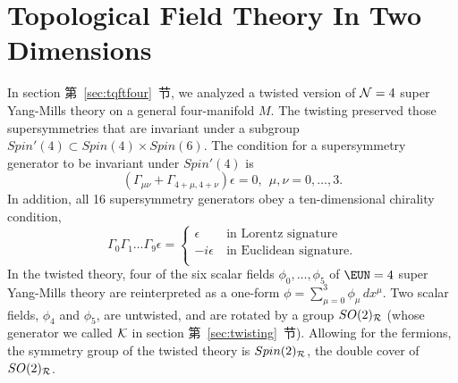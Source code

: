 
\section{Topological Field Theory In Two Dimensions}
\label{sec:tqfttwo}

In section 第~\ref{sec:tqftfour}~节, we analyzed a twisted version of ${\cal
N}=4$ super Yang-Mills theory on a general four-manifold $M$.  The
twisting preserved those supersymmetries that are invariant under
a subgroup $Spin'(4)\subset Spin(4)\times Spin(6)$.  The condition
for a supersymmetry generator to be invariant under $Spin'(4)$ is
\setcounter{equation}{0}
\begin{equation}\label{eq:tory}
\left(\Gamma_{\mu\nu}+\Gamma_{4+\mu,4+\nu}\right)\epsilon=0,
~~\mu,\nu=0,\dots,3.
\end{equation}
  In addition, all 16 supersymmetry
generators obey a ten-dimensional chirality condition,
\setcounter{equation}{1}
\begin{equation}\label{eq:nory}
\Gamma_0\Gamma_1\dots\Gamma_9\epsilon=\begin{cases}\epsilon&
~\text{in Lorentz signature}\\-i\epsilon&~\text{in Euclidean
signature.}\\\end{cases}
\end{equation}
 In the twisted theory, four of the six scalar
fields $\phi_0,\dots,\phi_5$ of ${\EUN}=4$ super Yang-Mills theory
are reinterpreted as a one-form
$\phi=\sum_{\mu=0}^3\phi_\mu\,dx^\mu$. Two scalar fields, $\phi_4$
and $\phi_5$, are untwisted, and are rotated by a group
$SO(2)_{\cal R}$ (whose generator we called ${\cal K}$ in section
第~\ref{sec:twisting}~节). Allowing for the fermions, the symmetry group of the
twisted theory is $Spin(2)_{\cal R}$, the double cover of
$SO(2)_{\cal R}$.

